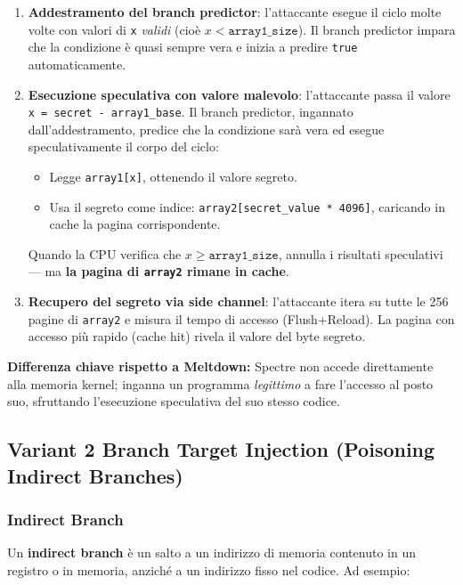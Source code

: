 \documentclass{article}
\begin{document}
\begin{enumerate}
    \item \textbf{Addestramento del branch predictor}: l'attaccante 
    esegue il ciclo molte volte con valori di \texttt{x} \textit{validi} 
    (cioè $x < \texttt{array1\_size}$). Il branch predictor impara che 
    la condizione è quasi sempre vera e inizia a predire 
    \texttt{true} automaticamente.

    \item \textbf{Esecuzione speculativa con valore malevolo}: 
    l'attaccante passa il valore \texttt{x = secret - array1\_base}. 
    Il branch predictor, ingannato dall'addestramento, predice che la 
    condizione sarà vera ed esegue speculativamente il corpo del ciclo:
    \begin{itemize}
        \item Legge \texttt{array1[x]}, ottenendo il valore segreto.
        \item Usa il segreto come indice: 
        \texttt{array2[secret\_value * 4096]}, caricando in cache 
        la pagina corrispondente.
    \end{itemize}
    Quando la CPU verifica che $x \geq \texttt{array1\_size}$, 
    annulla i risultati speculativi --- ma \textbf{la pagina di 
    \texttt{array2} rimane in cache}.

    \item \textbf{Recupero del segreto via side channel}: l'attaccante 
    itera su tutte le 256 pagine di \texttt{array2} e misura il tempo 
    di accesso (Flush+Reload). La pagina con accesso più rapido 
    (cache hit) rivela il valore del byte segreto.
\end{enumerate}

\noindent\textbf{Differenza chiave rispetto a Meltdown:} Spectre non 
accede direttamente alla memoria kernel; inganna un programma 
\textit{legittimo} a fare l'accesso al posto suo, sfruttando 
l'esecuzione speculativa del suo stesso codice.

\subsection*{Variant 2 Branch Target Injection (Poisoning Indirect Branches)}

\subsubsection*{Indirect Branch}

Un \textbf{indirect branch} è un salto a un indirizzo di memoria 
contenuto in un registro o in memoria, anziché a un indirizzo fisso 
nel codice. Ad esempio:
\end{document}
